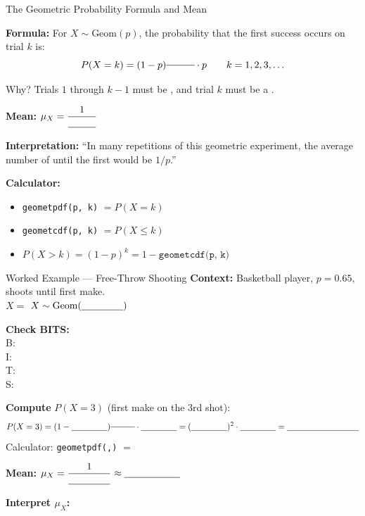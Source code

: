 \documentclass[10pt]{article}
\begin{document}
\vspace{0.1in}

\begin{notesbox}{The Geometric Probability Formula and Mean}
\small

\textbf{Formula:} For $X \sim \text{Geom}(p)$, the probability that the first
success occurs on trial $k$ is:
\[
  P(X = k) = (1-p)^{\blank{1cm}} \cdot p \qquad k = 1, 2, 3, \ldots
\]

\vspace{4pt}
Why? Trials $1$ through $k-1$ must be \blank{3cm}, and trial $k$ must be a
\blank{2cm}.

\vspace{8pt}
\textbf{Mean:} $\mu_X = \dfrac{1}{\blank{1cm}}$

\vspace{4pt}
\textbf{Interpretation:} ``In many repetitions of this geometric experiment, the
average number of \blank{3cm} until the first \blank{3cm} would be $1/p$.''

\vspace{8pt}
\textbf{Calculator:}
\begin{itemize}[itemsep=4pt]
  \item \texttt{geometpdf(p, k)} $= P(X = k)$
  \item \texttt{geometcdf(p, k)} $= P(X \le k)$
  \item $P(X > k) = (1-p)^k = 1 - \texttt{geometcdf(p, k)}$
\end{itemize}
\end{notesbox}

\vspace{0.1in}

\begin{notesbox}{Worked Example --- Free-Throw Shooting}
\small
\textbf{Context:} Basketball player, $p = 0.65$, shoots until first make.\\
$X = $ \blank{7cm} \quad $X \sim \text{Geom}(\blank{1.5cm})$

\vspace{6pt}
\textbf{Check BITS:}\\[4pt]
B: \blank{10cm}\\[4pt]
I: \blank{10cm}\\[4pt]
T: \blank{10cm}\\[4pt]
S: \blank{10cm}

\vspace{8pt}
\textbf{Compute} $P(X = 3)$ (first make on the 3rd shot):
\[
  P(X = 3) = (1 - \blank{1.5cm})^{\blank{1cm}} \cdot \blank{1.5cm}
           = (\blank{1.5cm})^2 \cdot \blank{1.5cm}
           = \blank{3cm}
\]
Calculator: \texttt{geometpdf(}\blank{1cm}\texttt{,}\texttt{)} $= $ \blank{2cm}

\vspace{8pt}
\textbf{Mean:} $\mu_X = \dfrac{1}{\blank{1.5cm}} \approx \blank{2cm}$

\vspace{6pt}
\textbf{Interpret $\mu_X$:} \writeline\\[1pt]\writeline
\end{notesbox}
\end{document}
